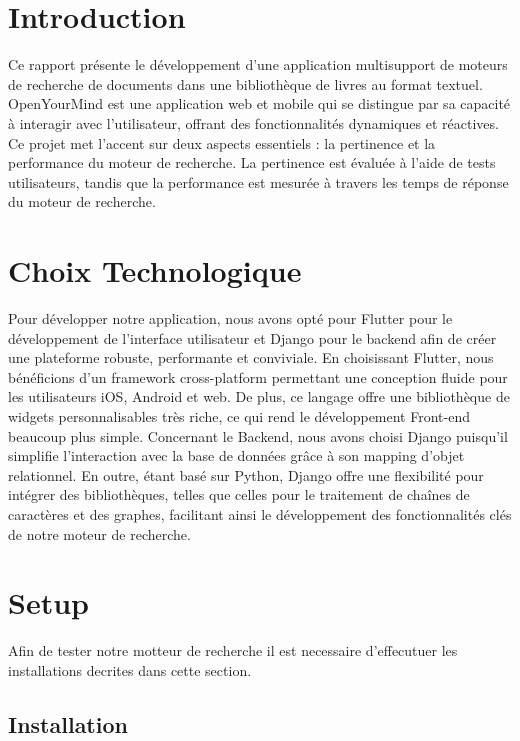 \newpage

\section{Introduction}\label{introduction}

Ce rapport présente le développement d'une application multisupport de
moteurs de recherche de documents dans une bibliothèque de livres au
format textuel. OpenYourMind est une application web et mobile qui se
distingue par sa capacité à interagir avec l'utilisateur, offrant des
fonctionnalités dynamiques et réactives. Ce projet met l'accent sur deux
aspects essentiels : la pertinence et la performance du moteur de
recherche. La pertinence est évaluée à l'aide de tests utilisateurs,
tandis que la performance est mesurée à travers les temps de réponse du
moteur de recherche.

\section{Choix Technologique}\label{choix-technologique}

Pour développer notre application, nous avons opté pour Flutter pour le
développement de l'interface utilisateur et Django pour le backend afin
de créer une plateforme robuste, performante et conviviale. En
choisissant Flutter, nous bénéficions d'un framework cross-platform
permettant une conception fluide pour les utilisateurs iOS, Android et
web. De plus, ce langage offre une bibliothèque de widgets
personnalisables très riche, ce qui rend le développement Front-end
beaucoup plus simple. Concernant le Backend, nous avons choisi Django
puisqu'il simplifie l'interaction avec la base de données grâce à son
mapping d'objet relationnel. En outre, étant basé sur Python, Django
offre une flexibilité pour intégrer des bibliothèques, telles que celles
pour le traitement de chaînes de caractères et des graphes, facilitant
ainsi le développement des fonctionnalités clés de notre moteur de
recherche.

\section{Setup}\label{setup}

Afin de tester notre motteur de recherche il est necessaire d'effecutuer
les installations decrites dans cette section.

\subsection{Installation}\label{installation}

